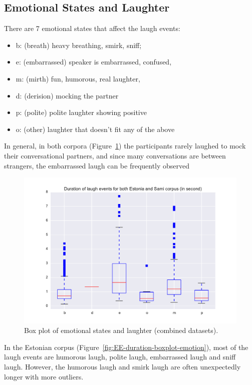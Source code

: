 \documentclass[10pt,journal,compsoc]{IEEEtran}
\begin{document}
\subsection{Emotional States and Laughter }

There are 7 emotional states that affect the laugh events:
\begin{itemize}
\item b: (breath) heavy breathing, smirk, sniff;
\item e: (embarrassed) speaker is embarrassed, confused,
\item m: (mirth) fun, humorous, real laughter,
\item d: (derision) mocking the partner
\item p: (polite) polite laughter showing positive
\item o: (other) laughter that doesn't fit any of the above
\end{itemize}

In general, in both corpora (Figure~\ref{fig:all-duration-boxplot-emotion}) the participants rarely laughed to mock their conversational partners, and since many conversations are between strangers, the embarrassed laugh can be frequently observed

\begin{figure}[!t]
\centering
\includegraphics[width=1\linewidth]{figures/all/duration_boxplot_emotion.pdf}
\caption{Box plot of emotional states and laughter (combined datasets).}
\label{fig:all-duration-boxplot-emotion}
\end{figure}

In the Estonian corpus (Figure~\ref{fig:EE-duration-boxplot-emotion}), most of the laugh events are humorous laugh, polite laugh, embarrassed laugh and sniff laugh. However, the humorous laugh and smirk laugh are often unexpectedly longer with more outliers.
\end{document}
